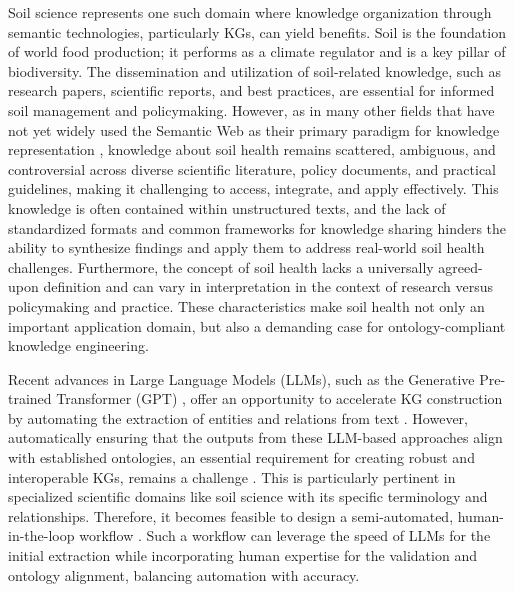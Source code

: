 \documentclass[preprint,12pt]{elsarticle}
\begin{document}
Soil science represents one such domain where knowledge organization through semantic technologies, particularly KGs, can yield benefits. Soil is the foundation of world food production; it performs as a climate regulator and is a key pillar of biodiversity. The dissemination and utilization of soil-related knowledge, such as research papers, scientific reports, and best practices, are essential for informed soil management and policymaking. However, as in many other fields that have not yet widely used the Semantic Web as their primary paradigm for knowledge representation \citep{DRURY2019487}, knowledge about soil health remains scattered, ambiguous, and controversial across diverse scientific literature, policy documents, and practical guidelines, making it challenging to access, integrate, and apply effectively. This knowledge is often contained within unstructured texts, and the lack of standardized formats and common frameworks for knowledge sharing hinders the ability to synthesize findings and apply them to address real-world soil health challenges. Furthermore, the concept of soil health lacks a universally agreed-upon definition and can vary in interpretation in the context of research versus policymaking and practice. These characteristics make soil health not only an important application domain, but also a demanding case for ontology-compliant knowledge engineering.

Recent advances in Large Language Models (LLMs), such as the Generative Pre-trained Transformer (GPT) \citep{openai2024gpt4technicalreport}, offer an opportunity to accelerate KG construction by automating the extraction of entities and relations from text \citep{Zhu2024}. However, automatically ensuring that the outputs from these LLM-based approaches align with established ontologies, an essential requirement for creating robust and interoperable KGs, remains a challenge \citep{bian2025llmempoweredknowledgegraphconstruction}. This is particularly pertinent in specialized scientific domains like soil science with its specific terminology and relationships. Therefore, it becomes feasible to design a semi-automated, human-in-the-loop workflow \citep{SHIMIZU2025100862}. Such a workflow can leverage the speed of LLMs for the initial extraction while incorporating human expertise for the validation and ontology alignment, balancing automation with accuracy.
\end{document}
